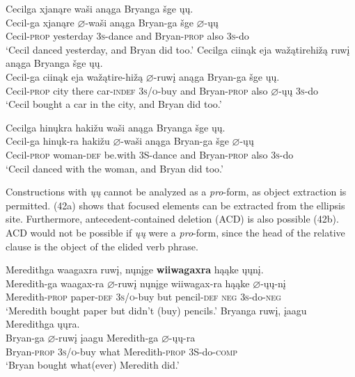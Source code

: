 \documentclass[output=paper]{LSP/langsci}
\begin{document}
\begin{exe}
\ex\label{ex:jrs:41}
\begin{xlist}
\ex 
\glll Cecilga 			xjanąre		wa\v{s}i anąga	Bryanga			\v{s}ge  	\k{u}\k{u}.\\
Cecil-ga			xjanąre		$\varnothing$-wa\v{s}i		anąga	Bryan-ga			\v{s}ge		$\varnothing$-\k{u}\k{u} \\
	Cecil-\textsc{prop}		yesterday	\textsc{3s}-dance	and			Bryan-\textsc{prop}	also	\textsc{3s}-do \\
\trans `Cecil danced yesterday, and Bryan did too.'
\ex 
\glll Cecilga 			ciinąk	eja		wa\v{z}ątirehi\v{z}ą		ruw\k{i}	anąga	Bryanga			\v{s}ge  \k{u}\k{u}. \\
Cecil-ga			ciinąk	eja		wa\v{z}ątire-hi\v{z}ą	$\varnothing$-ruw\k{i}			anąga	Bryan-ga	\v{s}ge \k{u}\k{u}. \\
Cecil-\textsc{prop}	city there	car-\textsc{indef}	\textsc{3s/o}-buy and Bryan-\textsc{prop}	also $\varnothing$-\k{u}\k{u} \textsc{3s}-do \\
\trans `Cecil bought a car in the city, and Bryan did too.'

\ex 
\glll Cecilga 		hin\k{u}kra	haki\v{z}u		wa\v{s}i		anąga	Bryanga			\v{s}ge		\k{u}\k{u}.\\
Cecil-ga		hin\k{u}k-ra	haki\v{z}u		$\varnothing$-wa\v{s}i		anąga	Bryan-ga	\v{s}ge		$\varnothing$-\k{u}\k{u} \\	Cecil-\textsc{prop}		woman-\textsc{def} 	be.with		3S-dance	and			Bryan-\textsc{prop}	also	\textsc{3s}-do \\
\trans `Cecil danced with the woman, and Bryan did too.'
\end{xlist}
\end{exe}

Constructions with \textit{\k{u}\k{u}} cannot be analyzed as a \textit{pro}-form, as object extraction is permitted. (42a) shows that focused elements can be extracted from the ellipsis site. Furthermore, antecedent-contained deletion (ACD) is also possible (42b). ACD would not be possible if \textit{\k{u}\k{u}} were a \textit{pro}-form, since the head of the relative clause is the object of the elided verb phrase.

\ea\label{ex:jrs:42}
\ea
\glll Meredithga		waagaxra	ruw\k{i},		n\k{u}n\k{i}ge		\textbf{wiiwagaxra}	hąąke	\k{u}\k{u}n\k{i}.\\
Meredith-ga  waagax-ra	 $\varnothing$-ruw\k{i} 	n\k{u}n\k{i}ge		wiiwagax-ra	hąąke $\varnothing$-\k{u}\k{u}-n\k{i}\\
Meredith-\textsc{prop}	paper-\textsc{def}	\textsc{3s/o}-buy	but pencil-\textsc{def} \textsc{neg}	 \textsc{3s}-do-\textsc{neg}\\
\trans `Meredith bought paper but didn't (buy) pencils.'
\ex 
\glll  Bryanga			ruw\k{i},				\k{i}aagu		Meredithga			\k{u}\k{u}ra.\\
Bryan-ga			$\varnothing$-ruw\k{i}	\k{i}aagu		Meredith-ga	$\varnothing$-\k{u}\k{u}-ra\\
	Bryan-\textsc{prop}	\textsc{3s/o}-buy		what		Meredith-\textsc{prop}		3S-do-\textsc{comp}\\
\trans `Bryan bought what(ever) Meredith did.'
\z
\z
\end{document}
